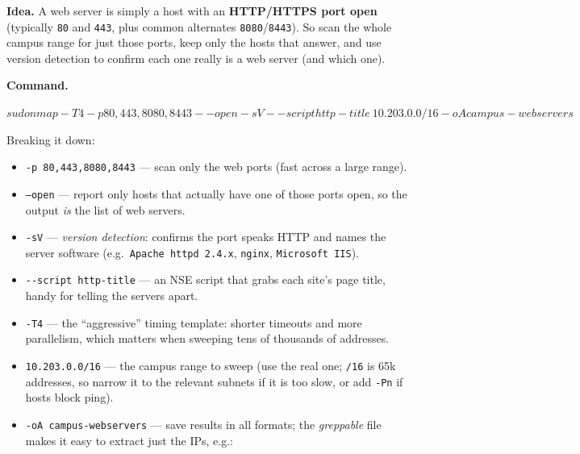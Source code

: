 \documentclass[a4paper, 10pt]{article}
\begin{document}
\begin{solution}
	\noindent \textbf{Idea.} A web server is simply a host with an \textbf{HTTP/HTTPS port open}
	(typically \texttt{80} and \texttt{443}, plus common alternates \texttt{8080}/\texttt{8443}).
	So scan the whole campus range for just those ports, keep only the hosts that answer, and use
	version detection to confirm each one really is a web server (and which one).

	\myspace

	\noindent \textbf{Command.}

	\myspace[v][1]

	\begin{codingbox*}[numbers=none, breaklines=true, basicstyle=\ttfamily\footnotesize\color{editortext}]
$ sudo nmap -T4 -p 80,443,8080,8443 --open -sV --script http-title \
            10.203.0.0/16 -oA campus-webservers
$
\end{codingbox*}

	\myspace

	\noindent Breaking it down:
	\begin{itemize}
		\item \texttt{-p 80,443,8080,8443} --- scan only the web ports (fast across a large range).
		\item \texttt{--open} --- report only hosts that actually have one of those ports open, so the
		      output \emph{is} the list of web servers.
		\item \texttt{-sV} --- \emph{version detection}: confirms the port speaks HTTP and names the
		      server software (e.g.\ \texttt{Apache httpd 2.4.x}, \texttt{nginx}, \texttt{Microsoft IIS}).
		\item \texttt{-{}-script http-title} --- an NSE script that grabs each site's page title, handy
		      for telling the servers apart.
		\item \texttt{-T4} --- the ``aggressive'' timing template: shorter timeouts and more
		      parallelism, which matters when sweeping tens of thousands of addresses.
		\item \texttt{10.203.0.0/16} --- the campus range to sweep (use the real one; \texttt{/16} is
		      65k addresses, so narrow it to the relevant subnets if it is too slow, or add
		      \texttt{-Pn} if hosts block ping).
		\item \texttt{-oA campus-webservers} --- save results in all formats; the \emph{greppable}
		      file makes it easy to extract just the IPs, e.g.:
	\end{itemize}


\end{solution}
\end{document}
